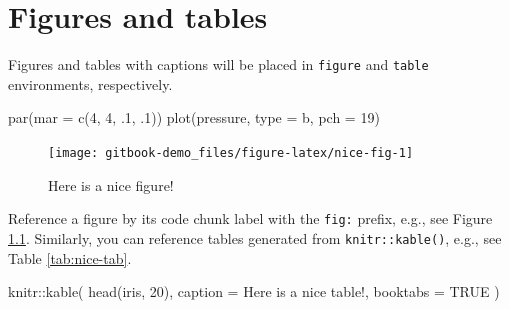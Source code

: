 \documentclass[
]{book}
\newenvironment{Shaded}{\begin{snugshade}}{\end{snugshade}}
\newcommand{\AttributeTok}[1]{\textcolor[rgb]{0.77,0.63,0.00}{#1}}
\newcommand{\ConstantTok}[1]{\textcolor[rgb]{0.00,0.00,0.00}{#1}}
\newcommand{\DecValTok}[1]{\textcolor[rgb]{0.00,0.00,0.81}{#1}}
\newcommand{\FunctionTok}[1]{\textcolor[rgb]{0.00,0.00,0.00}{#1}}
\newcommand{\NormalTok}[1]{#1}
\newcommand{\SpecialCharTok}[1]{\textcolor[rgb]{0.00,0.00,0.00}{#1}}
\newcommand{\StringTok}[1]{\textcolor[rgb]{0.31,0.60,0.02}{#1}}
\begin{document}
\hypertarget{figtab}{%
\chapter{Figures and tables}\label{figtab}}

Figures and tables with captions will be placed in \texttt{figure} and \texttt{table} environments, respectively.

\begin{Shaded}
\begin{Highlighting}[]
\FunctionTok{par}\NormalTok{(}\AttributeTok{mar =} \FunctionTok{c}\NormalTok{(}\DecValTok{4}\NormalTok{, }\DecValTok{4}\NormalTok{, .}\DecValTok{1}\NormalTok{, .}\DecValTok{1}\NormalTok{))}
\FunctionTok{plot}\NormalTok{(pressure, }\AttributeTok{type =} \StringTok{\textquotesingle{}b\textquotesingle{}}\NormalTok{, }\AttributeTok{pch =} \DecValTok{19}\NormalTok{)}
\end{Highlighting}
\end{Shaded}

\begin{figure}

{\centering \texttt{[image: gitbook-demo\_files/figure-latex/nice-fig-1]} 

}

\caption{Here is a nice figure!}\label{fig:nice-fig}
\end{figure}

Reference a figure by its code chunk label with the \texttt{fig:} prefix, e.g., see Figure \ref{fig:nice-fig}. Similarly, you can reference tables generated from \texttt{knitr::kable()}, e.g., see Table \ref{tab:nice-tab}.

\begin{Shaded}
\begin{Highlighting}[]
\NormalTok{knitr}\SpecialCharTok{::}\FunctionTok{kable}\NormalTok{(}
  \FunctionTok{head}\NormalTok{(iris, }\DecValTok{20}\NormalTok{), }\AttributeTok{caption =} \StringTok{\textquotesingle{}Here is a nice table!\textquotesingle{}}\NormalTok{,}
  \AttributeTok{booktabs =} \ConstantTok{TRUE}
\NormalTok{)}
\end{Highlighting}
\end{Shaded}
\end{document}
